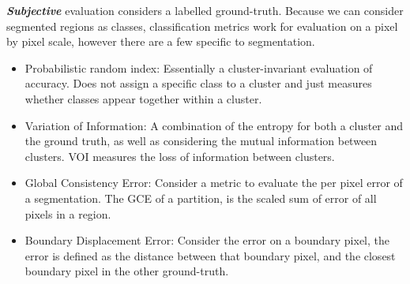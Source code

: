 \documentclass[a4]{article}
\begin{document}
\textbf{\textit{Subjective}} evaluation considers a labelled ground-truth. Because we can consider segmented regions as classes, classification metrics work for evaluation on a pixel by pixel scale, however there are a few specific to segmentation.
\begin{itemize}
\item Probabilistic random index: Essentially a cluster-invariant evaluation of accuracy. Does not assign a specific class to a cluster and just measures whether classes appear together within a cluster.
\item  Variation of Information: A combination of the entropy for both a cluster and the ground truth, as well as considering the mutual information between clusters. VOI measures the loss of information between clusters.
\item Global Consistency Error: Consider a metric to evaluate the per pixel error of a segmentation. The GCE of a partition, is the scaled sum of error of all pixels in a region.
\item Boundary Displacement Error: Consider the error on a boundary pixel, the error is defined as the distance between that boundary pixel, and the closest boundary pixel in the other ground-truth.
\end{itemize}



\end{document}

